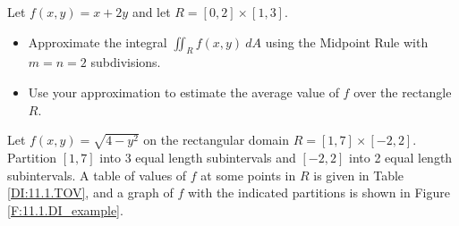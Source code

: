 \begin{activity} \label{A:11.1.11} 
  \ba
\item Let $f(x,y) = x+2y$ and let $R = [0,2] \times [1,3]$.
  \begin{itemize}
    \item Approximate the integral $\iint_Rf(x,y)~dA$ using the Midpoint
      Rule with $m=n=2$ subdivisions.   
    \item Use your approximation to estimate the average value of $f$
      over the rectangle $R$.
    \end{itemize}

\item  Let $f(x,y) = \sqrt{4-y^2}$ on the rectangular domain $R =
  [1,7] \times [-2,2]$. Partition $[1,7]$ into 3 equal length
  subintervals and $[-2,2]$ into 2 equal length subintervals. A table
  of values of $f$ at some points in $R$ is given in Table
  \ref{DI:11.1.TOV}, and a graph of $f$ with the indicated partitions
  is shown in Figure \ref{F:11.1.DI_example}. 


\end{activity}
